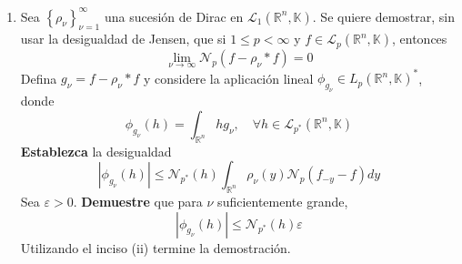 \documentclass[12pt]{report}
\newcounter{it}
\theoremstyle{largebreak}
\newcommand\abs[1]{\ensuremath{\left|#1\right|}}
\newcommand{\N}[2]{\ensuremath{\mathcal{N}_{#1}\left(#2\right)}}
\begin{document}
\begin{excer}
\begin{enumerate}
            \item Sea $\left\{\rho_\nu \right\}_{\nu=1}^\infty$ una sucesión de Dirac en $\mathcal{L}_1(\mathbb{R}^n,\mathbb{K})$. Se quiere demostrar, sin usar la desigualdad de Jensen, que si $1\leq p<\infty$ y $f\in\mathcal{L}_p(\mathbb{R}^n,\mathbb{K})$, entonces
            \begin{equation*}
                \lim_{\nu\rightarrow\infty}\N{p}{f-\rho_\nu*f}=0
            \end{equation*}
            Defina $g_\nu=f-\rho_\nu*f$ y considere la aplicación lineal $\phi_{g_\nu}\in L_{p}(\mathbb{R}^n,\mathbb{K})^*$, donde
            \begin{equation*}
                \phi_{g_\nu}(h)=\int_{\mathbb{R}^n}hg_\nu,\quad\forall h\in \mathcal{L}_{p^*}(\mathbb{R}^n,\mathbb{K})
            \end{equation*}
            \textbf{Establezca} la desigualdad
            \begin{equation*}
                \abs{\phi_{g_\nu}(h)}\leq\N{p^*}{h}\int_{\mathbb{R}^n}\rho_\nu(y)\N{p}{f_{-y}-f}dy
            \end{equation*}
            Sea $\varepsilon>0$. \textbf{Demuestre} que para $\nu$ suficientemente grande,
            \begin{equation*}
                \abs{\phi_{g_\nu}(h)}\leq\N{p^*}{h}\varepsilon
            \end{equation*}
            Utilizando el inciso (ii) termine la demostración.
        \end{enumerate}
    \end{excer}
\end{document}
